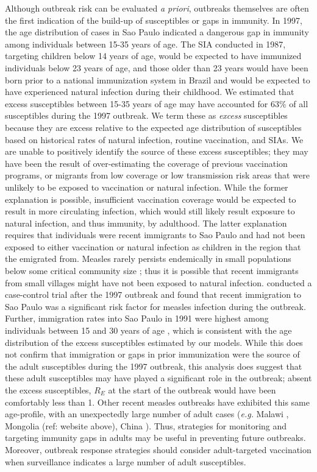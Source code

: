 Although outbreak risk can be evaluated \emph{a priori}, outbreaks themselves are often the first indication of the build-up of susceptibles or gaps in immunity. In 1997, the age distribution of cases in Sao Paulo indicated a dangerous gap in immunity among individuals between 15-35 years of
age. The SIA conducted in 1987, targeting children below 14 years of age, would be expected to have immunized individuals below 23 years of
age, and those older than 23 years would have been born prior to a national immunization system in Brazil and would be expected
to have experienced natural infection during their childhood. We estimated that excess susceptibles between 15-35 years of age may have accounted for 63\% of all susceptibles during the 1997 outbreak. We term these as \emph{excess} susceptibles because they are
excess relative to the expected age distribution of susceptibles based on historical rates of natural infection, routine vaccination, and SIAs. We are unable to positively identify the source of these excess susceptibles; they may have been the result of over-estimating the coverage of previous
vaccination programs, or migrants from low coverage or low transmission risk areas that were unlikely to be exposed to vaccination or natural infection. While the former explanation is possible, insufficient vaccination coverage would be expected to result in more circulating infection, which would still likely result exposure to natural infection, and thus immunity, by adulthood. The latter explanation requires that individuals were recent immigrants to Sao Paulo and had not been exposed to either vaccination or natural infection as children in the region that the emigrated from. Measles rarely persists endemically in small populations below some critical community size \cite{Conlan_2007, Keeling_1997}; thus it is possible that recent immigrants from small villages might have not been exposed to natural infection. \citet{Camargo_2000} conducted a case-control trial after the 1997 outbreak and found that recent immigration to Sao Paulo was a significant risk factor for measles infection during the outbreak. Further, immigration rates into Sao Paulo in 1991 were highest among individuals between 15 and 30 years of age  \cite{de_Moraes_2016}, which is consistent with the age distribution of the excess susceptibles estimated by our models. While this does not confirm that
immigration or gaps in prior immunization were the source of the adult susceptibles during the 1997 outbreak, this analysis does suggest that
these adult susceptibles may have played a significant role in the outbreak; absent the excess susceptibles, $R_E$ at the start of the outbreak would have been comfortably less than 1. Other recent measles outbreaks have exhibited this same age-profile, with an unexpectedly large number of adult cases (\emph{e.g.} Malawi \cite{Minetti_2013}, Mongolia (ref: website above), China \cite{Zheng_2015}). Thus, strategies for monitoring and targeting immunity gaps in adults may be useful in preventing future outbreaks. Moreover, outbreak response strategies should consider adult-targeted vaccination when surveillance indicates a large number of adult susceptibles.

